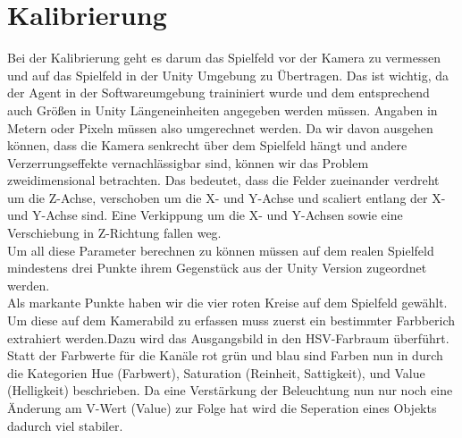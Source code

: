 \section{Kalibrierung}
\label{sect:kalib}
Bei der Kalibrierung geht es darum das Spielfeld vor der Kamera zu vermessen und auf das Spielfeld in der Unity Umgebung zu Übertragen. Das ist wichtig, da der Agent in der Softwareumgebung traininiert wurde und dem entsprechend auch Größen in Unity Längeneinheiten angegeben werden müssen. Angaben in Metern oder Pixeln müssen also umgerechnet werden. Da wir davon ausgehen können, dass die Kamera senkrecht über dem Spielfeld hängt und andere Verzerrungseffekte vernachlässigbar sind, können wir das Problem zweidimensional betrachten. Das bedeutet, dass die Felder zueinander verdreht um die Z-Achse, verschoben um die X- und Y-Achse und scaliert entlang der X- und Y-Achse sind. Eine Verkippung um die X- und Y-Achsen sowie eine Verschiebung in Z-Richtung fallen weg. \\
Um all diese Parameter berechnen zu können müssen auf dem realen Spielfeld mindestens drei Punkte ihrem Gegenstück aus der Unity Version zugeordnet werden.\\
Als markante Punkte haben wir die vier roten Kreise auf dem Spielfeld gewählt. Um diese auf dem Kamerabild zu erfassen muss zuerst ein bestimmter Farbberich extrahiert werden.Dazu wird das Ausgangsbild in den HSV-Farbraum überführt. Statt der Farbwerte für die Kanäle rot grün und blau sind Farben nun in durch die Kategorien Hue (Farbwert), Saturation (Reinheit, Sattigkeit), und Value (Helligkeit) beschrieben. Da eine Verstärkung der Beleuchtung nun nur noch eine Änderung am V-Wert (Value) zur Folge hat wird die Seperation eines Objekts dadurch viel stabiler.\\

